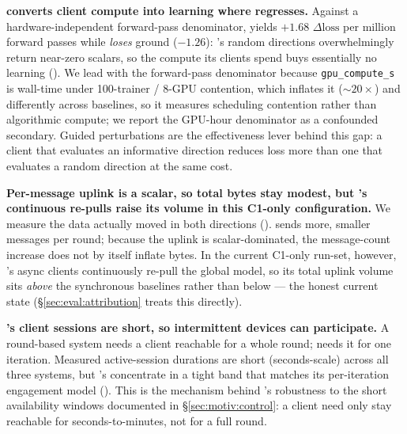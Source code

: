 

\textbf{\sys{} converts client compute into learning where \fwdllm{}
regresses.} Against a hardware-independent forward-pass denominator,
\sys{} yields $+1.68$ $\Delta\text{loss}$ per million forward passes
while \fwdllm{} \emph{loses} ground ($-1.26$): \fwdllm{}'s random
directions overwhelmingly return near-zero scalars, so the compute its
clients spend buys essentially no learning
(). \label{sec:eval:compute} We lead with the
forward-pass denominator because \texttt{gpu\_compute\_s} is wall-time
under 100-trainer / 8-GPU contention, which inflates it
(${\sim}20\times$) and differently across baselines, so it measures
scheduling contention rather than algorithmic compute; we report the
GPU-hour denominator as a confounded secondary. Guided perturbations
are the effectiveness lever behind this gap: a client that evaluates
an informative direction reduces loss more than one that evaluates a
random direction at the same cost.



\textbf{Per-message uplink is a scalar, so total bytes stay modest,
but \sys{}'s continuous re-pulls raise its volume in this C1-only
configuration.} We measure the data actually moved in both directions
(). \label{sec:eval:comm} \sys{} sends more,
smaller messages per round; because the uplink is scalar-dominated,
the message-count increase does not by itself inflate bytes. In the
current C1-only run-set, however, \sys{}'s async clients continuously
re-pull the global model, so its total uplink volume sits \emph{above}
the synchronous baselines rather than below --- the honest current
state (\S\ref{sec:eval:attribution} treats this directly). 



\textbf{\sys{}'s client sessions are short, so intermittent devices
can participate.} A round-based system needs a client reachable for a
whole round; \sys{} needs it for one iteration. Measured
active-session durations are short (seconds-scale) across all three
systems, but \sys{}'s concentrate in a tight band that matches its
per-iteration engagement model ().
\label{sec:eval:sessions} This is the mechanism behind \sys{}'s
robustness to the short availability windows documented in
\S\ref{sec:motiv:control}: a client need only stay reachable for
seconds-to-minutes, not for a full round.

